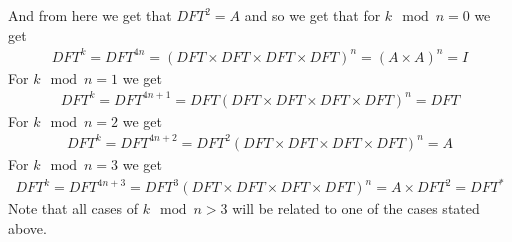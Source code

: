 \documentclass[english]{extarticle}
\numberwithin{equation}{section}
\numberwithin{figure}{section}
\begin{document}
And from here we get that $DFT^{2} = A$ and so we get that for $k \mod{n} = 0$ we get 
\begin{align}
    DFT^{k} = DFT^{4n} = (DFT \times DFT \times DFT \times DFT)^{n} = (A \times A) ^{n} = I
\end{align}
For $k \mod{n} = 1$ we get 
\begin{align}
    DFT^{k} = DFT^{4n+1} = DFT(DFT \times DFT \times DFT \times DFT)^{n} = DFT
\end{align}
For $k \mod{n} = 2$ we get 
\begin{align}
    DFT^{k} = DFT^{4n+2} = DFT^2(DFT \times DFT \times DFT \times DFT)^{n} = A
\end{align}
For $k \mod{n} = 3$ we get 
\begin{align}
    DFT^{k} = DFT^{4n+3} = DFT^3(DFT \times DFT \times DFT \times DFT)^{n} = A \times DFT^{2} = DFT^{*}
\end{align}
Note that all cases of $k \mod{n} > 3$ will be related to one of the cases stated above.
\end{document}
